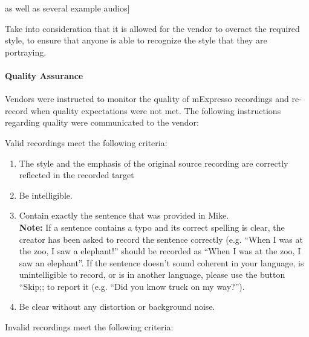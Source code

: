 \noindent as well as several example audios]

Take into consideration that it is allowed for the vendor to overact the required style, to ensure that anyone is able to recognize the style that they are portraying.



\paragraph{\textbf{Quality Assurance}}

Vendors were instructed to monitor the quality of mExpresso recordings and re-record when quality expectations were not met. The following instructions regarding quality were communicated to the vendor:

Valid recordings meet the following criteria:

\begin{enumerate}
\item The style and the emphasis of the original source recording are correctly reflected in the
recorded target
\item Be intelligible.
\item Contain exactly the sentence that was provided in Mike.\\\textbf{Note:} If a sentence contains a typo and its correct spelling is clear, the creator has
been asked to record the sentence correctly (e.g. ``When I was at the zoo, I saw
a elephant!'' should be recorded as ``When I was at the zoo, I saw an elephant''. If
the sentence doesn't sound coherent in your language, is unintelligible to record,
or is in another language, please use the button ``Skip;; to report it (e.g. ``Did you
know truck on my way?'').
\item Be clear without any distortion or background noise.
\end{enumerate}

Invalid recordings meet the following criteria:

